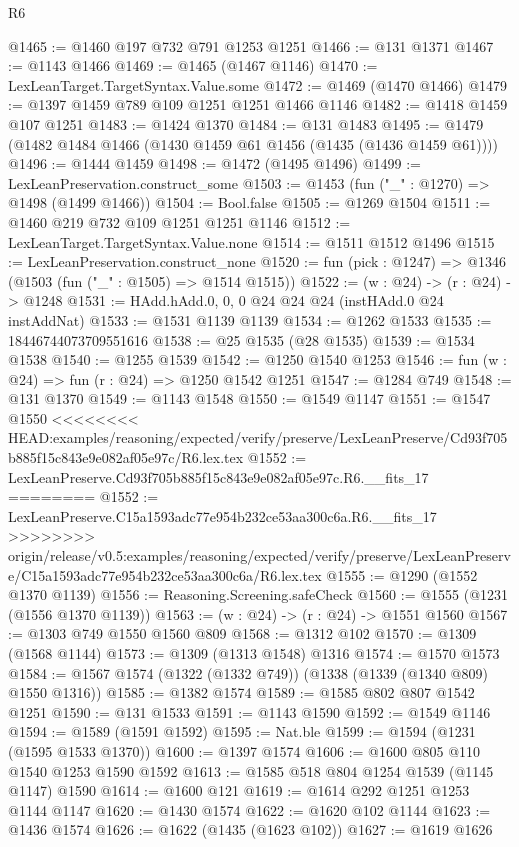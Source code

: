 \begin{lexlean}{R6}
\begin{coremodule}
{{{{{{{{{{{{{{{{{{{{{{{{{{{{{{{{{{{{{{{{{{{{{{{{{{{{{{{{{{{{{@1465 := @1460 @197 @732 @791 @1253 @1251
@1466 := @131 @1371
@1467 := @1143 @1466
@1469 := @1465 (@1467 @1146)
@1470 := LexLeanTarget.TargetSyntax.Value.some
@1472 := @1469 (@1470 @1466)
@1479 := @1397 @1459 @789 @109 @1251 @1251 @1466 @1146
@1482 := @1418 @1459 @107 @1251
@1483 := @1424 @1370
@1484 := @131 @1483
@1495 := @1479 (@1482 @1484 @1466 (@1430 @1459 @61 @1456 (@1435 (@1436 @1459 @61))))
@1496 := @1444 @1459
@1498 := @1472 (@1495 @1496)
@1499 := LexLeanPreservation.construct_some
@1503 := @1453 (fun ("_" : @1270) => @1498 (@1499 @1466))
@1504 := Bool.false
@1505 := @1269 @1504
@1511 := @1460 @219 @732 @109 @1251 @1251 @1146
@1512 := LexLeanTarget.TargetSyntax.Value.none
@1514 := @1511 @1512 @1496
@1515 := LexLeanPreservation.construct_none
@1520 := fun (pick : @1247) => @1346 (@1503 (fun ("_" : @1505) => @1514 @1515))
@1522 := (w : @24) -> (r : @24) -> @1248
@1531 := HAdd.hAdd.{0, 0, 0} @24 @24 @24 (instHAdd.{0} @24 instAddNat)
@1533 := @1531 @1139 @1139
@1534 := @1262 @1533
@1535 := 18446744073709551616
@1538 := @25 @1535 (@28 @1535)
@1539 := @1534 @1538
@1540 := @1255 @1539
@1542 := @1250 @1540 @1253
@1546 := fun (w : @24) => fun (r : @24) => @1250 @1542 @1251
@1547 := @1284 @749
@1548 := @131 @1370
@1549 := @1143 @1548
@1550 := @1549 @1147
@1551 := @1547 @1550
<<<<<<<< HEAD:examples/reasoning/expected/verify/preserve/LexLeanPreserve/Cd93f705b885f15c843e9e082af05e97c/R6.lex.tex
@1552 := LexLeanPreserve.Cd93f705b885f15c843e9e082af05e97c.R6.__fits_17
========
@1552 := LexLeanPreserve.C15a1593adc77e954b232ce53aa300c6a.R6.__fits_17
>>>>>>>> origin/release/v0.5:examples/reasoning/expected/verify/preserve/LexLeanPreserve/C15a1593adc77e954b232ce53aa300c6a/R6.lex.tex
@1555 := @1290 (@1552 @1370 @1139)
@1556 := Reasoning.Screening.safeCheck
@1560 := @1555 (@1231 (@1556 @1370 @1139))
@1563 := (w : @24) -> (r : @24) -> @1551 @1560
@1567 := @1303 @749 @1550 @1560 @809
@1568 := @1312 @102
@1570 := @1309 (@1568 @1144)
@1573 := @1309 (@1313 @1548) @1316
@1574 := @1570 @1573
@1584 := @1567 @1574 (@1322 (@1332 @749)) (@1338 (@1339 (@1340 @809) @1550 @1316))
@1585 := @1382 @1574
@1589 := @1585 @802 @807 @1542 @1251
@1590 := @131 @1533
@1591 := @1143 @1590
@1592 := @1549 @1146
@1594 := @1589 (@1591 @1592)
@1595 := Nat.ble
@1599 := @1594 (@1231 (@1595 @1533 @1370))
@1600 := @1397 @1574
@1606 := @1600 @805 @110 @1540 @1253 @1590 @1592
@1613 := @1585 @518 @804 @1254 @1539 (@1145 @1147) @1590
@1614 := @1600 @121
@1619 := @1614 @292 @1251 @1253 @1144 @1147
@1620 := @1430 @1574
@1622 := @1620 @102 @1144
@1623 := @1436 @1574
@1626 := @1622 (@1435 (@1623 @102))
@1627 := @1619 @1626
}}}}}}}}}}}}}}}}}}}}}}}}}}}}}}}}}}}}}}}}}}}}}}}}}}}}}}}}}}}}}
\end{coremodule}
\end{lexlean}
